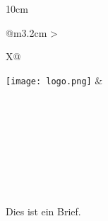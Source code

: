 \documentclass[a4paper,11pt]{article}
\newcommand{\contactinfo}{%
    \FiCompanyUrl \\
    \FiCompanyEmail \\
}
\begin{document}
\thispagestyle{firstpage}

\renewcommand{\footrulewidth}{0.4pt}

\begin{minipage}[t]{0.40\textwidth}
\raggedright
\vspace{-2.9em}
  \textsc{\FiClientCompany}\\[0.3ex]
  \textbf{\FiClientCareOf}\\[0.3ex]
  \FiClientStreet \\[0.3ex]
  \FiClientAreaCode\space \FiClientCity\\[0.3ex]
  \FiClientCountry \\[0.3ex]
\end{minipage}
\hfill
\begin{minipage}[t]{0.65\textwidth}
\begin{center}
\begin{tabularx}{10cm}{@{}m{3.2cm} >{\raggedright\arraybackslash}X@{}}
\texttt{[image: logo.png]} &
\begin{minipage}[t]{\linewidth}
  \vspace{-3.5em}
  \small
  \textbf{\FiCompanyName} \\[-0.2em]
  \FiCompanyStreet\\[-0.2ex]
  \FiCompanyAreaCodeCity\\[1.2ex]
  \contactinfo
\end{minipage}
\end{tabularx}
\end{center}
\end{minipage}

\setlength{\parindent}{0pt}
\setlength{\parskip}{0.5em}

\vspace{1.5cm}
\null\hfill \FiLetterCityDate \space \FiDate

\vspace{1.5cm}
\textbf{\FiSubject}
\vspace{1cm}

\greeting\\[2ex]
\\
Dies ist ein Brief.



\vspace{2em}
\FiGoodbye \\[2ex]
\FiMyName
\end{document}

